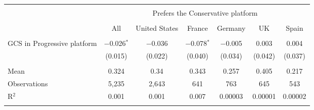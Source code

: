 
\begin{tabular}{@{\extracolsep{5pt}}lcccccc} 
\\[-1.8ex]\hline 
\hline \\[-1.8ex] 
 & \multicolumn{6}{c}{Prefers the Conservative platform} \\ 
\cline{2-7} 
\\[-1.8ex] & All & United States & France & Germany & UK & Spain \\ 
\hline \\[-1.8ex] 
 GCS in Progressive platform & $-$0.026$^{*}$ & $-$0.036 & $-$0.078$^{*}$ & $-$0.005 & 0.003 & 0.004 \\ 
  & (0.015) & (0.022) & (0.040) & (0.034) & (0.042) & (0.037) \\ 
 \hline \\[-1.8ex] 
Mean & 0.324 & 0.34 & 0.343 & 0.257 & 0.405 & 0.217 \\ 
Observations & 5,235 & 2,643 & 641 & 763 & 645 & 543 \\ 
R$^{2}$ & 0.001 & 0.001 & 0.007 & 0.00003 & 0.00001 & 0.00002 \\ 
\hline 
\hline \\[-1.8ex] 
\end{tabular} 
